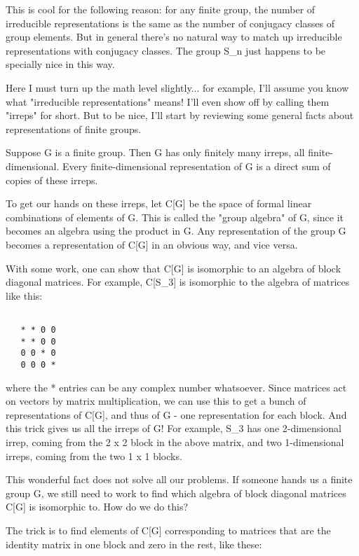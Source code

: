 This is cool for the following reason: for any finite group, the number
of irreducible representations is the same as the number of conjugacy
classes of group elements.  But in general there's no natural way to 
match up irreducible representations with conjugacy classes.  The group
S_{n} just happens to be specially nice in this way.

Here I must turn up the math level slightly... for example, I'll assume
you know what "irreducible representations" means!  I'll even
show off by calling them "irreps" for short.  But to be nice,
I'll start by reviewing some general facts about representations of
finite groups.

Suppose G is a finite group.  Then G has only finitely many irreps, all
finite-dimensional.  Every finite-dimensional representation of G is a
direct sum of copies of these irreps.  

To get our hands on these irreps, let C[G] be the space of formal linear
combinations of elements of G.  This is called the "group
algebra" of G, since it becomes an algebra using the product in G.
Any representation of the group G becomes a representation of C[G] in an
obvious way, and vice versa.

With some work, one can show that C[G] is isomorphic to an algebra
of block diagonal matrices.  For example, C[S_{3}] is isomorphic to the
algebra of matrices like this:


\begin{verbatim}

   * * 0 0 
   * * 0 0
   0 0 * 0 
   0 0 0 *
\end{verbatim}
    
where the * entries can be any complex number whatsoever.  Since
matrices act on vectors by matrix multiplication, we can use this to get
a bunch of representations of C[G], and thus of G - one representation
for each block.  And this trick gives us all the irreps of G!  For
example, S_{3} has one 2-dimensional irrep, coming from the 2 x
2 block in the above matrix, and two 1-dimensional irreps, coming from
the two 1 x 1 blocks.

This wonderful fact does not solve all our problems.  If someone hands
us a finite group G, we still need to work to find which algebra of block
diagonal matrices C[G] is isomorphic to.  How do we do this?  

The trick is to find elements of C[G] corresponding to matrices that
are the identity matrix in one block and zero in the rest, like these:


